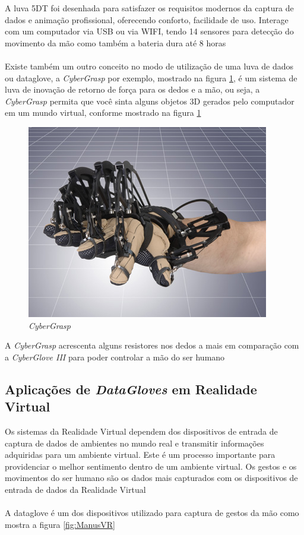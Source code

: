 \documentclass[12pt]{article}
\begin{document}
A luva 5DT foi desenhada para satisfazer os requisitos modernos da captura de dados e animação profissional, oferecendo conforto, facilidade de uso. Interage com um computador via USB ou via WIFI, tendo 14 sensores para detecção do movimento da mão como também a bateria dura até 8 horas \cite{o-larnnithipong_2016}
\\ \\
Existe também um outro conceito no modo de utilização de uma luva de dados ou dataglove, a \textit{CyberGrasp} por exemplo, mostrado na figura \ref{fig:grasp3}, é um sistema de luva de inovação de retorno de força para os dedos e a mão, ou seja, a \textit{CyberGrasp} permita que você sinta alguns objetos 3D gerados pelo computador em um mundo virtual, conforme mostrado na figura \ref{fig:grasp3}

\begin{figure}[H]
    \centering
    \includegraphics[width=.7\textwidth]{images/grasp3.jpg}
    \caption{\textit{CyberGrasp}}
    \label{fig:grasp3}
\end{figure}

A \textit{CyberGrasp} acrescenta alguns resistores nos dedos a mais em comparação com a \textit{CyberGlove III} para poder controlar a mão do ser humano \cite{o-larnnithipong_2016}

\subsection{Aplicações de \textit{DataGloves} em Realidade Virtual}

Os sistemas da Realidade Virtual dependem dos dispositivos de entrada de captura de dados de ambientes no mundo real e transmitir informações adquiridas para um ambiente virtual. Este é um processo importante para providenciar o melhor sentimento dentro de um ambiente virtual. Os gestos e os movimentos do ser humano são os dados mais capturados com os dispositivos de entrada de dados da Realidade Virtual \cite{hee_2017}
\\ \\ 
A dataglove é um dos dispositivos utilizado para captura de gestos da mão como mostra a figura \ref{fig:ManusVR}
\end{document}
